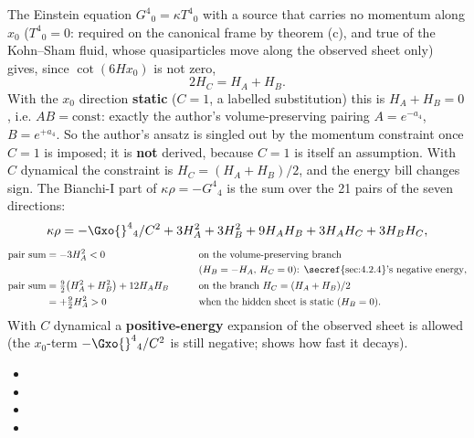 The Einstein equation $G^4{}_0=\kappa T^4{}_0$ with a source that carries no momentum along $x_0$
($T^4{}_0=0$: required on the canonical frame by theorem (c), and true of the Kohn--Sham fluid, whose
quasiparticles move along the observed sheet only) gives, since $\cot(6Hx_0)$ is not zero,
\[
  2H_C=H_A+H_B .
\]
With the $x_0$ direction \textbf{static} ($C=1$, a labelled substitution) this is $H_A+H_B=0$, i.e.
$AB=\text{const}$: exactly the author's volume-preserving pairing $A=e^{-a_4}$, $B=e^{+a_4}$. So the
author's ansatz is singled out by the momentum constraint once $C=1$ is imposed; it is \textbf{not}
derived, because $C=1$ is itself an assumption. With $C$ dynamical the constraint is
$H_C=(H_A+H_B)/2$, and the energy bill changes sign. The Bianchi-I part of $\kappa\rho=-G^4{}_4$ is the
sum over the 21 pairs of the seven directions:
\[
  \kappa\rho=-\Gxo{}^4{}_4/C^2+3H_A^2+3H_B^2+9H_AH_B+3H_AH_C+3H_BH_C,
\]
\begin{alignat*}{2}
  \text{pair sum}&=-3H_A^2<0 &\qquad&\text{on the volume-preserving branch}\\
  & &&\text{($H_B=-H_A$, $H_C=0$): \secref{sec:4.2.4}'s negative energy},\\
  \text{pair sum}&=\tfrac92\bigl(H_A^2+H_B^2\bigr)+12H_AH_B &&\text{on the branch } H_C=(H_A+H_B)/2\\
  &=+\tfrac92H_A^2>0 &&\text{when the hidden sheet is static ($H_B=0$).}
\end{alignat*}
With $C$ dynamical a \textbf{positive-energy} expansion of the observed sheet is allowed (the $x_0$-term
$-\Gxo{}^4{}_4/C^2$ is still negative;  shows how fast it decays). 
\begin{itemize}
  \item {}
  \item {}
  \item {}
  \item {}
\end{itemize}

